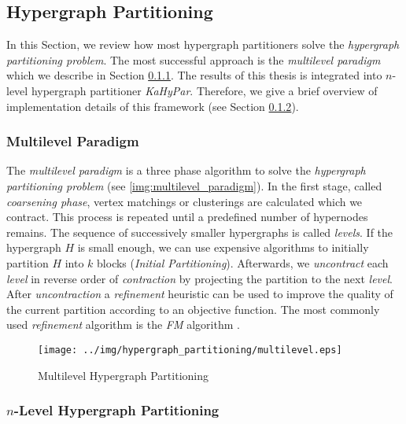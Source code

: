 
\subsection{Hypergraph Partitioning}

In this Section, we review how most hypergraph partitioners solve the \emph{hypergraph
partitioning problem}. The most successful
approach is the \emph{multilevel paradigm} \cite{alpert1995recent,bader2013graph,
papa2007hypergraph} which we describe in Section \ref{sec:multilevel_paradigm}.
The results of this thesis is integrated into $n$-level hypergraph partitioner \emph{KaHyPar}. Therefore, we
give a brief overview of implementation details of this framework (see Section \ref{sec:kahypar}).

\subsubsection{Multilevel Paradigm}
\label{sec:multilevel_paradigm}

The \emph{multilevel paradigm} is a three phase algorithm to solve the \emph{hypergraph 
partitioning problem} (see \autoref{img:multilevel_paradigm}). In the first stage, called
\emph{coarsening phase}, vertex matchings or clusterings are calculated which we contract. This process is
repeated until a predefined number of hypernodes remains. The sequence of successively
smaller hypergraphs is called \emph{levels}. If the hypergraph $H$ is small enough, we can use
expensive algorithms to initially partition $H$ into $k$ blocks (\emph{Initial Partitioning}). Afterwards, we
\emph{uncontract} each \emph{level} in reverse order of \emph{contraction} by projecting
the partition to the next \emph{level}. After \emph{uncontraction} a \emph{refinement} heuristic can be
used to improve the quality of the current partition according
to an objective function. The most commonly used \emph{refinement} algorithm is the \emph{FM}
algorithm \cite{fiduccia1988linear}.

\begin{figure}
\centering
\texttt{[image: ../img/hypergraph\_partitioning/multilevel.eps]}
\caption{Multilevel Hypergraph Partitioning}
\label{img:multilevel_paradigm}
\end{figure}


\subsubsection{$n$-Level Hypergraph Partitioning}
\label{sec:kahypar}

